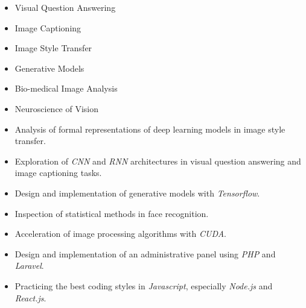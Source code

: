 \documentclass[10pt,a4paper]{altacv}
\begin{document}
\begin{multicols}{2}
\begin{itemize}
    \item Visual Question Answering
    \item Image Captioning
    \item Image Style Transfer
    \item Generative Models
  	\item Bio-medical Image Analysis
  	\item Neuroscience of Vision
\end{itemize}
\end{multicols}


\begin{itemize}
\item Analysis of formal representations of deep learning models in image style transfer.
\item Exploration of \textit{CNN} and \textit{RNN} architectures in visual question answering and image captioning tasks.
\item Design and implementation of generative models with \textit{Tensorflow}.
\item Inspection of statistical methods in face recognition.
\item Acceleration of image processing algorithms with \textit{CUDA}.
\end{itemize}


\begin{itemize}
\item Design and implementation of an administrative panel using \textit{PHP} and \textit{Laravel}.
\item Practicing the best coding styles in \textit{Javascript}, especially \textit{Node.js} and \textit{React.js}.
\end{itemize}

\divider
\end{document}
